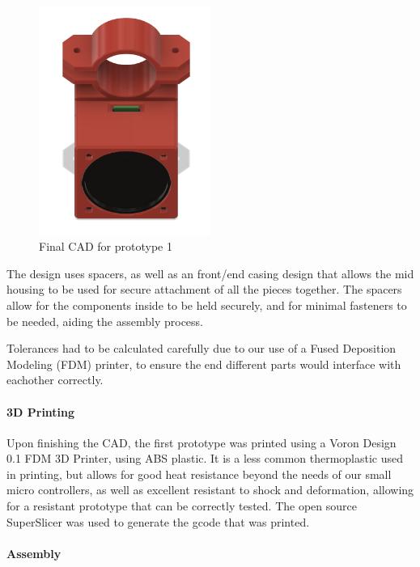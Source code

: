 {\begin{figure}[ht!]
            \includegraphics[width=0.5\textwidth,keepaspectratio, angle=0]{./Images/final-cad.png}
            \caption{Final CAD for prototype 1}
        \label{fig:gantt_chart}
    \end{figure}

The design uses spacers, as well as an front/end casing design that allows the mid housing to be used for secure attachment of all the pieces together. The spacers allow for the components inside to be held securely, and for minimal fasteners to be needed, aiding the assembly process.



Tolerances had to be calculated carefully due to our use of a Fused Deposition Modeling (FDM) printer, to ensure the end different parts would interface with eachother correctly.

\paragraph{3D Printing}

Upon finishing the CAD, the first prototype was printed using a Voron Design 0.1 FDM 3D Printer, using ABS plastic. It is a less common thermoplastic used in printing, but allows for good heat resistance beyond the needs of our small micro controllers, as well as excellent resistant to shock and deformation, allowing for a resistant prototype that can be correctly tested. The open source SuperSlicer was used to generate the gcode that was printed.

\paragraph{Assembly}

}
